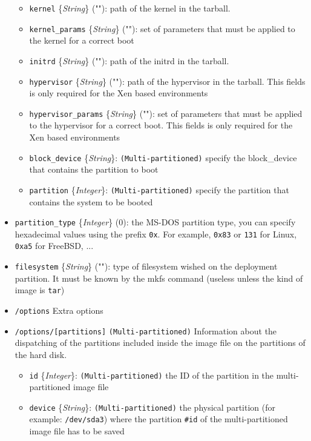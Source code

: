 \documentclass[a4wide,10pt,oneside]{book}
\newcommand{\ypath}[1]{\texttt{#1}}
\newcommand{\yfield}[2]{\texttt{#1} {\small\{{\emph{#2}}\}}:}
\newcommand{\yfieldd}[3]{\texttt{#1} {\small\{{\emph{#2}}\}} {\small(}#3{\small)}:}
\begin{document}
\begin{itemize}
  \begin{itemize}
    \item \yfieldd{kernel}{String}{""} path of the kernel in the tarball.
    \item \yfieldd{kernel\_params}{String}{""} set of parameters that must be applied to the kernel for a correct boot
    \item \yfieldd{initrd}{String}{""} path of the initrd in the tarball.
    \item \yfieldd{hypervisor}{String}{""} path of the hypervisor in the tarball. This fields is only required for the Xen based environments
    \item \yfieldd{hypervisor\_params}{String}{""} set of parameters that must be applied to the hypervisor for a correct boot. This fields is only required for the Xen based environments
    \item \yfield{block\_device}{String} \texttt{(Multi-partitioned)} specify the block\_device that contains the partition to boot
    \item \yfield{partition}{Integer} \texttt{(Multi-partitioned)} specify the partition that contains the system to be booted
  \end{itemize}
  \item \yfieldd{partition\_type}{Integer}{0} the MS-DOS partition type, you can specify hexadecimal values using the prefix \texttt{0x}. For example, \texttt{0x83} or \texttt{131} for Linux, \texttt{0xa5} for FreeBSD, ...
  \item \yfieldd{filesystem}{String}{""} type of filesystem wished on the deployment partition. It must be known by the mkfs command (useless unless the kind of image is \texttt{tar})
  \item \ypath{/options} Extra options
  \item \ypath{/options/[partitions]} \texttt{(Multi-partitioned)} Information about the dispatching of the partitions included inside the image file on the partitions of the hard disk.
  \begin{itemize}
    \item \yfield{id}{Integer} \texttt{(Multi-partitioned)} the ID of the partition in the multi-partitioned image file
    \item \yfield{device}{String} \texttt{(Multi-partitioned)} the physical partition (for example: \texttt{/dev/sda3}) where the partition \texttt{\#id} of the multi-partitioned image file has to be saved
  \end{itemize}
\end{itemize}
\end{document}
